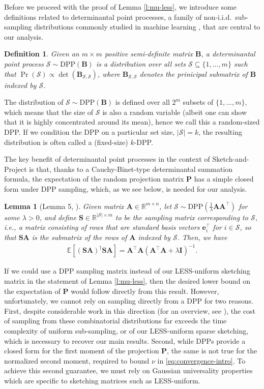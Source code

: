 \documentclass[11pt]{article}
\let\origtop\top
\renewcommand\top{{\scriptscriptstyle{\origtop}}}
\def\DPP{\mathrm{DPP}}
\def\A{{\mathbf A}}
\def\B{{\mathbf B}}
\def\I{{\mathbf I}}
\def\S{{\mathbf S}}
\def\setS{{\mathcal S}}
\def\P{{\mathbf P}}
\def\E{{\mathds E}}
\def\R{{\mathbf R}}
\def\R{{\mathds R}}
\newtheorem{lem}[thm]{Lemma}
\newtheorem{dfn}[thm]{Definition}
\begin{document}
Before we proceed with the proof of Lemma \ref{l:mu-less}, we introduce some definitions related to determinantal point processes, a family of non-i.i.d.~sub-sampling distributions commonly studied in machine learning \cite{kulesza2012determinantal}, that are central to our analysis.
\begin{dfn}\label{d:dpp}
    Given an $m\times m$ positive semi-definite matrix $\B$, a determinantal point process $\setS\sim\DPP(\B)$ is a distribution over all sets $\setS\subseteq\{1,...,m\}$ such that $\Pr(\setS)\propto \det(\B_{\setS,\setS})$, where $\B_{\setS,\setS}$ denotes the prinicipal submatrix of $\B$ indexed by $\setS$.
\end{dfn}
The distribution of $\setS\sim\DPP(\B)$ is defined over all $2^m$ subsets of $\{1,...,m\}$, which means that the size of $\setS$ is also a random variable (albeit one can show that it is highly concentrated around its mean), hence we call this a random-sized DPP. If we condition the DPP on a particular set size, $|\setS|=k$, the resulting distribution is often called a (fixed-size) $k$-DPP.

The key benefit of determinantal point processes in the context of Sketch-and-Project is that, thanks to a Cauchy-Binet-type determinantal summation formula, the expectation of the random projection matrix $\P$ has a simple closed form under DPP sampling, which, as we see below, is needed for our analysis.

\begin{lem}[Lemma 5, \cite{derezinski2020improved}]\label{l:dpp-formula}
Given matrix $\A\in\R^{m\times n}$, let $\setS\sim \DPP(\frac1\lambda\A\A^\top)$ for some $\lambda>0$, and define $\S \in \R^{|\setS| \times m}$ to be the sampling matrix  corresponding to $\setS$, i.e., a matrix consisting of rows that are standard basis vectors $\mathbf{e}_i^\top$ for $i\in \setS$, so that $\S\A$ is the submatrix of the rows of $\A$ indexed by $\setS$. Then, we have
\begin{align}\label{eq:proj_lower_bound}
\E[(\S\A)^\dagger\S \A] = \A^\top\A(\A^\top\A+\lambda\I)^{-1}.
\end{align}
\end{lem}
If we could use a DPP sampling matrix instead of our LESS-uniform sketching matrix in the statement of Lemma \ref{l:mu-less}, then the desired lower bound on the expectation of $\P$ would follow directly from this result.
However, unfortunately, we cannot rely on sampling directly from a DPP for two reasons. First, despite considerable work in this direction (for an overview, see \cite{derezinski2021determinantal}), the cost of sampling from these combinatorial distributions far exceeds the time complexity of uniform sub-sampling, or of our LESS-uniform sparse sketching, which is necessary to recover our main results. Second, while DPPs provide a closed form for the first moment of the projection $\P$, the same is not true for the normalized second moment, required to bound $\nu$ in \eqref{eq:convergence-intro}. To achieve this second guarantee, we must rely on Gaussian universality properties which are specific to sketching matrices such as LESS-uniform.
\end{document}

